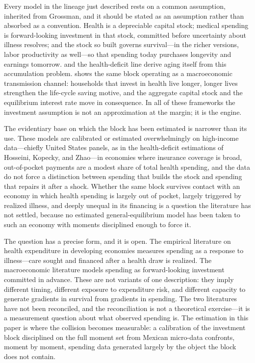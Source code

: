 \documentclass[12pt,a4paper]{article}
\begin{document}
Every model in the lineage just described rests on a common assumption, inherited from Grossman, and it should be stated as an assumption rather than absorbed as a convention. Health is a depreciable capital stock; medical spending is forward-looking investment in that stock, committed before uncertainty about illness resolves; and the stock so built governs survival---in the richer versions, labor productivity as well---so that spending today purchases longevity and earnings tomorrow. \citet{DalgaardStrulik2014} and the health-deficit line derive aging itself from this accumulation problem. \citet{Carrasco2026} shows the same block operating as a macroeconomic transmission channel: households that invest in health live longer, longer lives strengthen the life-cycle saving motive, and the aggregate capital stock and the equilibrium interest rate move in consequence. In all of these frameworks the investment assumption is not an approximation at the margin; it is the engine.

The evidentiary base on which the block has been estimated is narrower than its use. These models are calibrated or estimated overwhelmingly on high-income data---chiefly United States panels, as in the health-deficit estimations of Hosseini, Kopecky, and Zhao---in economies where insurance coverage is broad, out-of-pocket payments are a modest share of total health spending, and the data do not force a distinction between spending that builds the stock and spending that repairs it after a shock. Whether the same block survives contact with an economy in which health spending is largely out of pocket, largely triggered by realized illness, and deeply unequal in its financing is a question the literature has not settled, because no estimated general-equilibrium model has been taken to such an economy with moments disciplined enough to force it.

The question has a precise form, and it is open. The empirical literature on health expenditure in developing economies measures spending as a response to illness---care sought and financed after a health draw is realized. The macroeconomic literature models spending as forward-looking investment committed in advance. These are not variants of one description: they imply different timing, different exposure to expenditure risk, and different capacity to generate gradients in survival from gradients in spending. The two literatures have not been reconciled, and the reconciliation is not a theoretical exercise---it is a measurement question about what observed spending is. The estimation in this paper is where the collision becomes measurable: a calibration of the investment block disciplined on the full moment set from Mexican micro-data confronts, moment by moment, spending data generated largely by the object the block does not contain.
\end{document}
